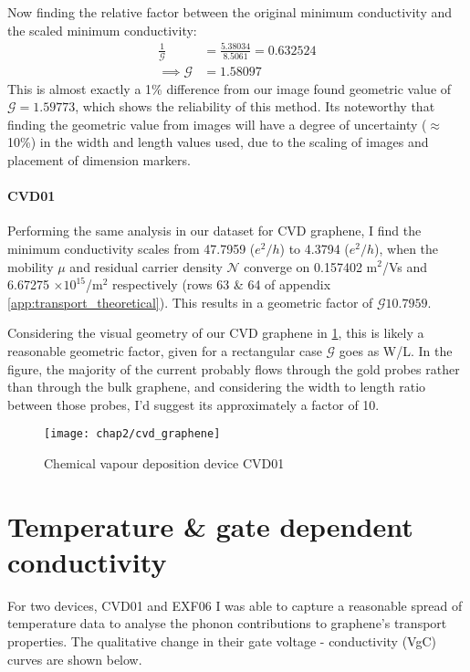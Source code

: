 \documentclass[../Matt_Gebert_Honours_Thesis.tex]{subfiles}
\begin{document}
	Now finding the relative factor between the original minimum conductivity and the scaled minimum conductivity:
	\begin{align}
		\frac{1}{\mathcal{G}} &= \frac{5.38034}{8.5061} = 0.632524\\
		\implies \mathcal{G} &= 1.58097
	\end{align}
	This is almost exactly a 1\% difference from our image found geometric value of $\mathcal{G} = 1.59773$, which shows the reliability of this method. 
	Its noteworthy that finding the geometric value from images will have a degree of uncertainty ($\approx$10\%) in the width and length values used, due to the scaling of images and placement of dimension markers.

	\paragraph{CVD01}
	Performing the same analysis in our dataset for CVD graphene, I find the minimum conductivity scales from 47.7959 ($e^2/h$) to 4.3794 ($e^2/h$), when the mobility $\mu$ and residual carrier density $\mathcal{N}$ converge on 0.157402 m$^2$/Vs and 6.67275 $\times10^{15}$/m$^2$ respectively (rows 63 \& 64 of appendix \ref{app:transport_theoretical}). This results in a geometric factor of $\mathcal{G} 10.7959$.

	Considering the visual geometry of our CVD graphene in \cref{fig:cvd_sample}, this is likely a reasonable geometric factor, given for a rectangular case $\mathcal{G}$ goes as W/L. In the figure, the majority of the current probably flows through the gold probes rather than through the bulk graphene, and considering the width to length ratio between those probes, I'd suggest its approximately a factor of 10.
	\begin{figure}[H]
		\centering
		\texttt{[image: chap2/cvd\_graphene]}
		\caption[Device CVD01]{Chemical vapour deposition device CVD01}\label{fig:cvd_sample}
	\end{figure}

\section{Temperature \& gate dependent conductivity}
For two devices, CVD01 and EXF06 I was able to capture a reasonable spread of temperature data to analyse the phonon contributions to graphene's transport properties. The qualitative change in their gate voltage - conductivity (VgC) curves are shown below.
\end{document}
